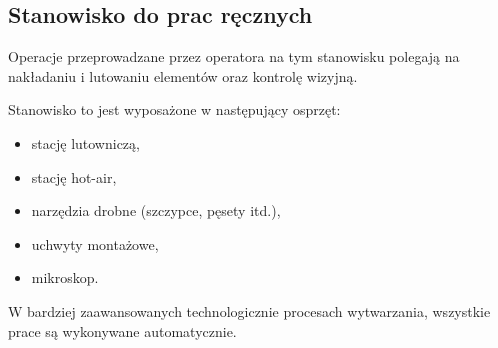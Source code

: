 \subsection{Stanowisko do prac ręcznych}
Operacje przeprowadzane przez operatora na tym stanowisku polegają na nakładaniu i lutowaniu elementów oraz kontrolę wizyjną.

\breakparagraph{}
Stanowisko to jest wyposażone w następujący osprzęt:
\begin{itemize}
	\item stację lutowniczą,
	\item stację hot-air,
	\item narzędzia drobne (szczypce, pęsety itd.),
	\item uchwyty montażowe,
	\item mikroskop.
\end{itemize}

W bardziej zaawansowanych technologicznie procesach wytwarzania, wszystkie prace są wykonywane automatycznie.
